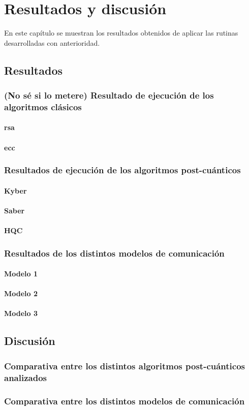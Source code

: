 \chapter{Resultados y discusión}

En este capítulo se muestran los resultados obtenidos de aplicar las rutinas desarrolladas con anterioridad.


\section{Resultados}
\subsection{(No sé si lo metere) Resultado de ejecución de los algoritmos clásicos}
\subsubsection{\gls{rsa}}
\subsubsection{\gls{ecc}}
\subsection{Resultados de ejecución de los algoritmos post-cuánticos}
\subsubsection{Kyber}
\subsubsection{Saber}
\subsubsection{HQC}

\subsection{Resultados de los distintos modelos de comunicación}
\subsubsection{Modelo 1}
\subsubsection{Modelo 2}
\subsubsection{Modelo 3}
\section{Discusión}
\subsection{Comparativa entre los distintos algoritmos post-cuánticos analizados}
\subsection{Comparativa entre los distintos modelos de comunicación}
